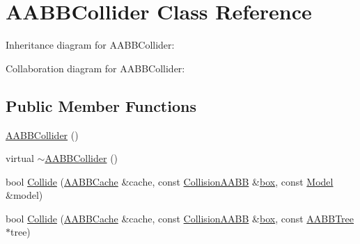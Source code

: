 \hypertarget{class_a_a_b_b_collider}{\section{A\+A\+B\+B\+Collider Class Reference}
\label{class_a_a_b_b_collider}
}


Inheritance diagram for A\+A\+B\+B\+Collider\+:


Collaboration diagram for A\+A\+B\+B\+Collider\+:
\subsection*{Public Member Functions}
\begin{DoxyCompactItemize}
\item 
\hyperlink{class_a_a_b_b_collider_a6a679c11c6a716b1f7a387aa5fa1884a}{A\+A\+B\+B\+Collider} ()
\item 
virtual \hyperlink{class_a_a_b_b_collider_a21f405d3f68a7196286ba9933e34674e}{$\sim$\+A\+A\+B\+B\+Collider} ()
\item 
bool \hyperlink{class_a_a_b_b_collider_a6c5443558bd612a744bbfc74ff2b7368}{Collide} (\hyperlink{struct_a_a_b_b_cache}{A\+A\+B\+B\+Cache} \&cache, const \hyperlink{class_collision_a_a_b_b}{Collision\+A\+A\+B\+B} \&\hyperlink{structbox}{box}, const \hyperlink{class_model}{Model} \&model)
\item 
bool \hyperlink{class_a_a_b_b_collider_ad26d4fe09769619954dad20961c56f78}{Collide} (\hyperlink{struct_a_a_b_b_cache}{A\+A\+B\+B\+Cache} \&cache, const \hyperlink{class_collision_a_a_b_b}{Collision\+A\+A\+B\+B} \&\hyperlink{structbox}{box}, const \hyperlink{class_a_a_b_b_tree}{A\+A\+B\+B\+Tree} $\ast$tree)
\end{DoxyCompactItemize}
